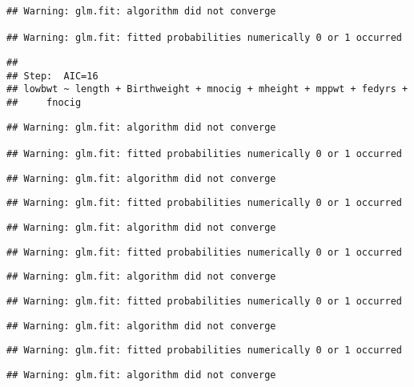 \documentclass[]{article}
\begin{document}
\begin{verbatim}
## Warning: glm.fit: algorithm did not converge

## Warning: glm.fit: fitted probabilities numerically 0 or 1 occurred
\end{verbatim}

\begin{verbatim}
## 
## Step:  AIC=16
## lowbwt ~ length + Birthweight + mnocig + mheight + mppwt + fedyrs + 
##     fnocig
\end{verbatim}

\begin{verbatim}
## Warning: glm.fit: algorithm did not converge

## Warning: glm.fit: fitted probabilities numerically 0 or 1 occurred
\end{verbatim}

\begin{verbatim}
## Warning: glm.fit: algorithm did not converge
\end{verbatim}

\begin{verbatim}
## Warning: glm.fit: fitted probabilities numerically 0 or 1 occurred
\end{verbatim}

\begin{verbatim}
## Warning: glm.fit: algorithm did not converge
\end{verbatim}

\begin{verbatim}
## Warning: glm.fit: fitted probabilities numerically 0 or 1 occurred
\end{verbatim}

\begin{verbatim}
## Warning: glm.fit: algorithm did not converge
\end{verbatim}

\begin{verbatim}
## Warning: glm.fit: fitted probabilities numerically 0 or 1 occurred
\end{verbatim}

\begin{verbatim}
## Warning: glm.fit: algorithm did not converge
\end{verbatim}

\begin{verbatim}
## Warning: glm.fit: fitted probabilities numerically 0 or 1 occurred
\end{verbatim}

\begin{verbatim}
## Warning: glm.fit: algorithm did not converge
\end{verbatim}
\end{document}
